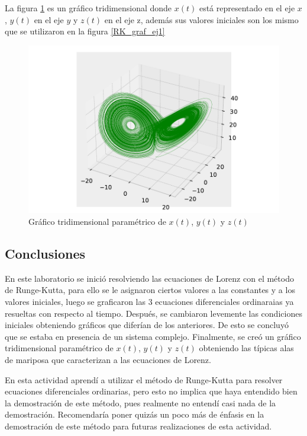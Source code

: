 \documentclass[../portafolio.tex]{subfiles}
\begin{document}
\vspace{2mm}
La figura \ref{mariposa} es un gráfico tridimensional donde $x(t)$ está representado en el eje $x$, $y(t)$ en el eje $y$ y $z(t)$ en el eje z, además sus valores iniciales son los mismo que se utilizaron en la figura \ref{RK_graf_ej1}

\begin{figure}[H]
    \centering
    \includegraphics[scale=0.6]{tex/img/ej3_RK_graf.pdf}
    \caption{Gráfico tridimensional paramétrico de $x(t)$, $y(t)$ y $z(t)$}
    \label{mariposa}
\end{figure}




\subsection{Conclusiones}

En este laboratorio se inició resolviendo las ecuaciones de Lorenz con el método de Runge-Kutta, para ello se le asignaron ciertos valores a las constantes y a los valores iniciales, luego se graficaron las 3 ecuaciones diferenciales ordinaraias ya resueltas con respecto al tiempo. Después, se cambiaron levemente las condiciones iniciales obteniendo gráficos que diferían de los anteriores. De esto se concluyó que se estaba en presencia de un sistema complejo. Finalmente, se creó un gráfico tridimensional paramétrico de $x(t)$, $y(t)$ y $z(t)$ obteniendo las típicas alas de mariposa que caracterizan a las ecuaciones de Lorenz.

\vspace{2mm}
En esta actividad aprendí a utilizar el método de Runge-Kutta para resolver ecuaciones diferenciales ordinarias, pero esto no implica que haya entendido bien la demostración de este método, pues realmente no entendí casi nada de la demostración. Recomendaría poner quizás un poco más de énfasis en la demostración de este método para futuras realizaciones de esta actividad.
\end{document}
